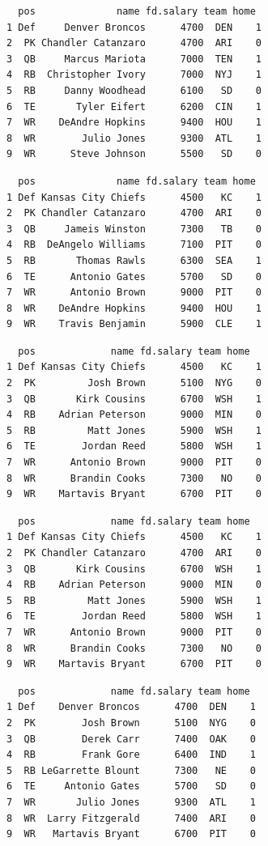 \documentclass[10pt]{article}
\begin{document}
\begin{lstlisting}
  pos              name fd.salary team home
1 Def     Denver Broncos      4700  DEN    1
2  PK Chandler Catanzaro      4700  ARI    0
3  QB     Marcus Mariota      7000  TEN    1
4  RB  Christopher Ivory      7000  NYJ    1
5  RB     Danny Woodhead      6100   SD    0
6  TE       Tyler Eifert      6200  CIN    1
7  WR    DeAndre Hopkins      9400  HOU    1
8  WR        Julio Jones      9300  ATL    1
9  WR      Steve Johnson      5500   SD    0
\end{lstlisting}

\begin{lstlisting}
  pos              name fd.salary team home
1 Def Kansas City Chiefs      4500   KC    1
2  PK Chandler Catanzaro      4700  ARI    0
3  QB     Jameis Winston      7300   TB    0
4  RB  DeAngelo Williams      7100  PIT    0
5  RB       Thomas Rawls      6300  SEA    1
6  TE      Antonio Gates      5700   SD    0
7  WR      Antonio Brown      9000  PIT    0
8  WR    DeAndre Hopkins      9400  HOU    1
9  WR    Travis Benjamin      5900  CLE    1
\end{lstlisting}

\begin{lstlisting}
  pos             name fd.salary team home
1 Def Kansas City Chiefs      4500   KC    1
2  PK         Josh Brown      5100  NYG    0
3  QB       Kirk Cousins      6700  WSH    1
4  RB    Adrian Peterson      9000  MIN    0
5  RB         Matt Jones      5900  WSH    1
6  TE        Jordan Reed      5800  WSH    1
7  WR      Antonio Brown      9000  PIT    0
8  WR      Brandin Cooks      7300   NO    0
9  WR    Martavis Bryant      6700  PIT    0
\end{lstlisting}

\begin{lstlisting}
  pos             name fd.salary team home
1 Def Kansas City Chiefs      4500   KC    1
2  PK Chandler Catanzaro      4700  ARI    0
3  QB       Kirk Cousins      6700  WSH    1
4  RB    Adrian Peterson      9000  MIN    0
5  RB         Matt Jones      5900  WSH    1
6  TE        Jordan Reed      5800  WSH    1
7  WR      Antonio Brown      9000  PIT    0
8  WR      Brandin Cooks      7300   NO    0
9  WR    Martavis Bryant      6700  PIT    0
\end{lstlisting}

\begin{lstlisting}
  pos             name fd.salary team home
1 Def    Denver Broncos      4700  DEN    1
2  PK        Josh Brown      5100  NYG    0
3  QB        Derek Carr      7400  OAK    0
4  RB        Frank Gore      6400  IND    1
5  RB LeGarrette Blount      7300   NE    0
6  TE     Antonio Gates      5700   SD    0
7  WR       Julio Jones      9300  ATL    1
8  WR  Larry Fitzgerald      7400  ARI    0
9  WR   Martavis Bryant      6700  PIT    0
\end{lstlisting}
\end{document}
